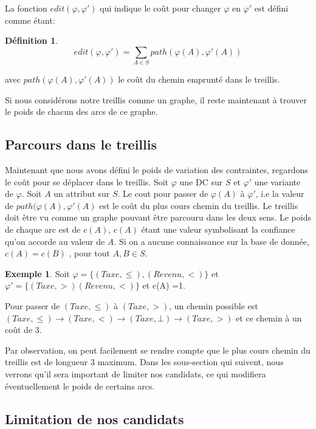 \documentclass[letterpaper, 12pt]{report}
\theoremstyle{definition}
\newtheorem{mydef}{Définition}
\newtheorem{myexample}{Exemple}
\begin{document}
La fonction $edit(\varphi , \varphi ')$ qui indique le coût pour changer $\varphi$ en $\varphi'$ est défini comme étant:

\begin{mydef}
$$
 edit(\varphi, \varphi') = \sum_{A \in S} path(\varphi(A),\varphi'(A))$$
 
avec $path(\varphi(A),\varphi'(A))$ le coût du chemin emprunté dans le treillis.
\end{mydef}

Si nous considérons notre treillis comme un graphe, il reste maintenant à trouver le poids de chacun des arcs de ce graphe.

\subsection{Parcours dans le treillis}

	Maintenant que nous avons défini le poids de variation des contraintes, regardons le coût pour se déplacer dans le treillis. Soit $\varphi$ une DC sur $S$ et $\varphi'$ une variante de $\varphi$. Soit $A$ un attribut sur $S$. Le cout pour passer de $\varphi(A)$ à $\varphi'$, i.e la valeur de $path(\varphi(A),\varphi'(A)$ est le coût du plus cours chemin du treillis. Le treillis doit être vu comme un graphe pouvant être parcouru dans les deux sens. Le poids de chaque arc est de $c(A)$, $c(A)$ étant une valeur symbolisant la confiance qu'on accorde au valeur de $A$. Si on a aucune connaissance sur la base de donnée, $c(A) =c(B)$ , pour tout $A,B \in S$.
	
\begin{myexample}
	Soit $\varphi = \{(Taxe,\leq),(Revenu,<) \}$ et $\varphi' = \{(Taxe,>)(Revenu,<) \}$ et c(A) =1.
	
	Pour passer de $(Taxe,\leq)$ à $(Taxe,>)$, un chemin possible est $(Taxe,\leq) \rightarrow (Taxe,<) \rightarrow (Taxe,\bot) \rightarrow (Taxe,>)$ et ce chemin à un coût de 3.
\end{myexample}

Par observation, on peut facilement se rendre compte que le plus cours chemin du treillis est de longueur 3 maximum. Dans les sous-section qui suivent, nous verrons qu'il sera important de limiter nos candidats, ce qui modifiera éventuellement le poids de certains arcs.

\subsection{Limitation de nos candidats}
\end{document}
